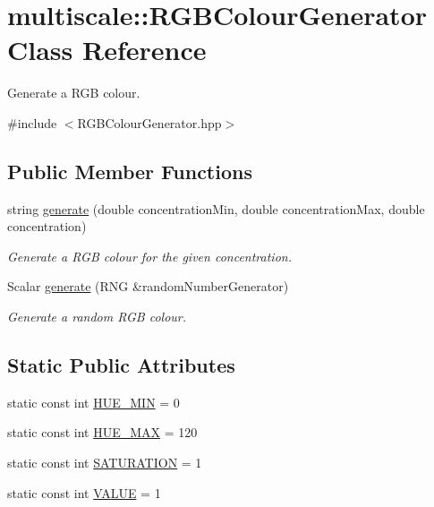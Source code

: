 \hypertarget{classmultiscale_1_1RGBColourGenerator}{\section{multiscale\-:\-:\-R\-G\-B\-Colour\-Generator \-Class \-Reference}
\label{classmultiscale_1_1RGBColourGenerator}
}


\-Generate a \-R\-G\-B colour.  




{\ttfamily \#include $<$\-R\-G\-B\-Colour\-Generator.\-hpp$>$}

\subsection*{\-Public \-Member \-Functions}
\begin{DoxyCompactItemize}
\item 
string \hyperlink{classmultiscale_1_1RGBColourGenerator_ab96622fb17f93d1f92a3b8b9fd978725}{generate} (double concentration\-Min, double concentration\-Max, double concentration)
\begin{DoxyCompactList}\small\item\em \-Generate a \-R\-G\-B colour for the given concentration. \end{DoxyCompactList}\item 
\-Scalar \hyperlink{classmultiscale_1_1RGBColourGenerator_a9eadd001d970bdb3c4237ab3a1b6683a}{generate} (\-R\-N\-G \&random\-Number\-Generator)
\begin{DoxyCompactList}\small\item\em \-Generate a random \-R\-G\-B colour. \end{DoxyCompactList}\end{DoxyCompactItemize}
\subsection*{\-Static \-Public \-Attributes}
\begin{DoxyCompactItemize}
\item 
static const int \hyperlink{classmultiscale_1_1RGBColourGenerator_ae31c47c9fccf50b3688728126040bc23}{\-H\-U\-E\-\_\-\-M\-I\-N} = 0
\item 
static const int \hyperlink{classmultiscale_1_1RGBColourGenerator_a282d986019f3c02b46c122badf806cd0}{\-H\-U\-E\-\_\-\-M\-A\-X} = 120
\item 
static const int \hyperlink{classmultiscale_1_1RGBColourGenerator_a9442495dac9306e4172a27cba12788cc}{\-S\-A\-T\-U\-R\-A\-T\-I\-O\-N} = 1
\item 
static const int \hyperlink{classmultiscale_1_1RGBColourGenerator_a859abef56e015354d032c46680132850}{\-V\-A\-L\-U\-E} = 1
\end{DoxyCompactItemize}
